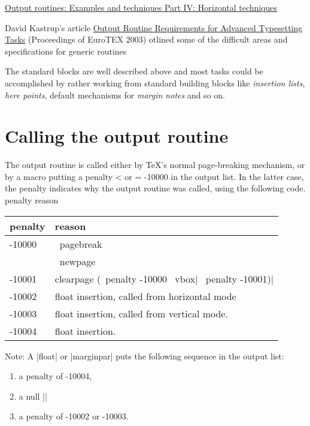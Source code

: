 \href{http://www.tug.org/TUGboat/Articles/tb15-1/tb42salomon-output.pdf}{Output routines: Examples and techniques Part IV: Horizontal techniques}


David Kastrup's article \href{http://www.tug.org/TUGboat/Articles/tb24-3/kastrup.pdf}{Output Routine Requirements for Advanced Typesetting Tasks} (Proceedings of EuroTEX 2003) otlined some of the difficult areas and specifications for generic routines

The standard blocks are well described above and most tasks could be accomplished 
by rather working from
standard building blocks like \textit{insertion lists}, \textit{here points},
default mechanisms for \textit{margin notes} and so on.


\section*{Calling the output routine}

The output routine is called either by TeX's normal page-breaking
mechanism, or by a macro putting a penalty < or = -10000 in the output
list. In the latter case, the penalty indicates why the output
routine was called, using the following code.
penalty reason

\begin{tabular}{ll}
\toprule
penalty &reason\\
\midrule
-10000  &\ pagebreak\\
~       &\ newpage\\
-10001  &clearpage (\ penalty -10000 \ vbox{}| \ penalty -10001)|\\
-10002  &float insertion, called from horizontal mode\\
-10003 &float insertion, called from vertical mode.\\
-10004 &float insertion.\\
\bottomrule
\end{tabular}
\medskip

Note: A |float| or |marginpar| puts the following sequence in the output
list: 

\begin{enumerate}
\item a penalty of -10004,

\item a null |\vbox|

\item a penalty of -10002 or -10003.
\end{enumerate}

